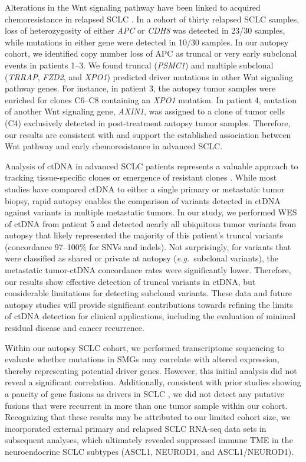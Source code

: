 Alterations in the Wnt signaling pathway have been linked to acquired chemoresistance in relapsed SCLC \cite{wagner2018}. In a cohort of thirty relapsed SCLC samples, loss of heterozygosity of either \textit{APC} or \textit{CDH8} was detected in 23/30 samples, while mutations in either gene were detected in 10/30 samples. In our autopsy cohort, we identified copy number loss of APC as truncal or very early subclonal events in patients 1--3. We found truncal (\textit{PSMC1}) and multiple subclonal (\textit{TRRAP}, \textit{FZD2}, and \textit{XPO1}) predicted driver mutations in other Wnt signaling pathway genes. For instance, in patient 3, the autopsy tumor samples were enriched for clones C6--C8 containing an \textit{XPO1} mutation. In patient 4, mutation of another Wnt signaling gene, \textit{AXIN1}, was assigned to a clone of tumor cells (C4) exclusively detected in post-treatment autopsy tumor samples. Therefore, our results are consistent with and support the established association between Wnt pathway and early chemoresistance in advanced SCLC\@.

Analysis of ctDNA in advanced SCLC patients represents a valuable approach to tracking tissue-specific clones or emergence of resistant clones \cite{nong2018}. While most studies have compared ctDNA to either a single primary or metastatic tumor biopsy, rapid autopsy enables the comparison of variants detected in ctDNA against variants in multiple metastatic tumors. In our study, we performed WES of ctDNA from patient 5 and detected nearly all ubiquitous tumor variants from autopsy that likely represented the majority of this patient's truncal variants (concordance 97--100\% for SNVs and indels). Not surprisingly, for variants that were classified as shared or private at autopsy (\textit{e.g.}\ subclonal variants), the metastatic tumor-ctDNA concordance rates were significantly lower. Therefore, our results show effective detection of truncal variants in ctDNA, but considerable limitations for detecting subclonal variants. These data and future autopsy studies will provide significant contributions towards refining the limits of ctDNA detection for clinical applications, including the evaluation of minimal residual disease and cancer recurrence.

Within our autopsy SCLC cohort, we performed transcriptome sequencing to evaluate whether mutations in SMGs may correlate with altered expression, thereby representing potential driver genes. However, this initial analysis did not reveal a significant correlation. Additionally, consistent with prior studies showing a paucity of gene fusions as drivers in SCLC \cite{iwakawa2013}, we did not detect any putative fusions that were recurrent in more than one tumor sample within our cohort. Recognizing that these results may be attributed to our limited cohort size, we incorporated external primary and relapsed SCLC RNA-seq data sets in subsequent analyses, which ultimately revealed suppressed immune TME in the neuroendocrine SCLC subtypes (ASCL1, NEUROD1, and ASCL1/NEUROD1).

